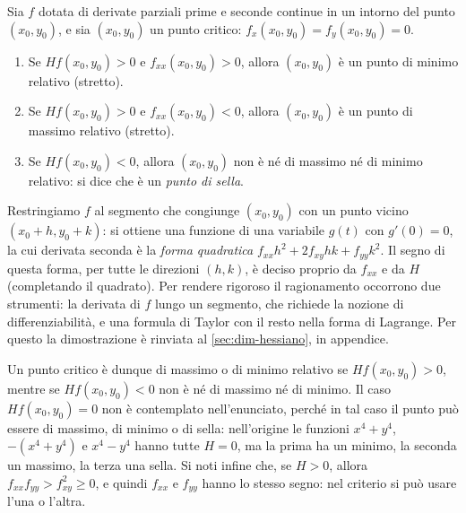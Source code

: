 \begin{teorema}\label{teo:hessiano}
Sia $f$ dotata di derivate parziali prime e seconde continue in un intorno del punto
$(x_{0},y_{0})$, e sia $(x_{0},y_{0})$ un punto critico:
$f_{x}(x_{0},y_{0})=f_{y}(x_{0},y_{0})=0$.
\begin{enumerate}[label=\textup{(\roman*)}]
  \item Se $Hf(x_{0},y_{0})>0$ e $f_{xx}(x_{0},y_{0})>0$, allora $(x_{0},y_{0})$ è un punto di
  minimo relativo (stretto).
  \item Se $Hf(x_{0},y_{0})>0$ e $f_{xx}(x_{0},y_{0})<0$, allora $(x_{0},y_{0})$ è un punto di
  massimo relativo (stretto).
  \item Se $Hf(x_{0},y_{0})<0$, allora $(x_{0},y_{0})$ non è né di massimo né di minimo
  relativo: si dice che è un \emph{punto di sella}.
\end{enumerate}
\end{teorema}

\begin{schema}
\end{schema}

\begin{strategia}
Restringiamo $f$ al segmento che congiunge $(x_{0},y_{0})$ con un punto vicino
$(x_{0}+h,y_{0}+k)$: si ottiene una funzione di una variabile $g(t)$ con $g'(0)=0$, la cui
derivata seconda è la \emph{forma quadratica}
$f_{xx}h^{2}+2f_{xy}hk+f_{yy}k^{2}$. Il segno di questa forma, per tutte le direzioni $(h,k)$,
è deciso proprio da $f_{xx}$ e da $H$ (completando il quadrato). Per rendere rigoroso il
ragionamento occorrono due strumenti: la derivata di $f$ lungo un segmento, che richiede
la nozione di differenziabilità, e una formula di Taylor con il resto nella forma di
Lagrange. Per questo la dimostrazione è rinviata al \cref{sec:dim-hessiano}, in
appendice.
\end{strategia}

Un punto critico è dunque di massimo o di minimo relativo se $Hf(x_{0},y_{0})>0$, mentre
se $Hf(x_{0},y_{0})<0$ non è né di massimo né di minimo. Il caso $Hf(x_{0},y_{0})=0$ non è
contemplato nell'enunciato, perché in tal caso il punto può essere di massimo, di minimo
o di sella: nell'origine le funzioni $x^{4}+y^{4}$, $-(x^{4}+y^{4})$ e
$x^{4}-y^{4}$ hanno tutte $H=0$, ma la prima ha un minimo, la seconda un massimo, la terza
una sella. Si noti infine che, se $H>0$, allora $f_{xx}f_{yy}>f_{xy}^{2}\ge0$, e quindi
$f_{xx}$ e $f_{yy}$ hanno lo stesso segno: nel criterio si può usare l'una o l'altra.

